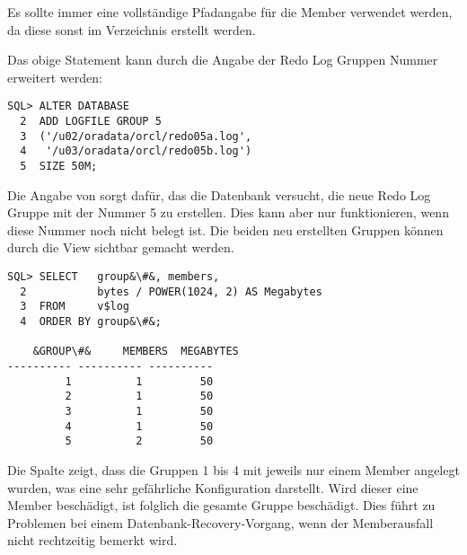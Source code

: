           \begin{merke}
            Es sollte immer eine vollständige Pfadangabe für die Member verwendet werden, da diese sonst im Verzeichnis  erstellt werden.
          \end{merke}
          Das obige Statement kann durch die Angabe der Redo Log Gruppen Nummer erweitert werden:
          \begin{lstlisting}[caption={Erzeugen einer Redo Log Gruppe mit Angabe der Gruppennummer},label=admin31,language=oracle_sql]
SQL> ALTER DATABASE
  2  ADD LOGFILE GROUP 5
  3  ('/u02/oradata/orcl/redo05a.log',
  4   '/u03/oradata/orcl/redo05b.log')
  5  SIZE 50M;
          \end{lstlisting}
          Die Angabe von  sorgt dafür, das die Datenbank versucht, die neue Redo Log Gruppe mit der Nummer 5 zu erstellen. Dies kann aber nur funktionieren, wenn diese Nummer noch nicht belegt ist. Die beiden neu erstellten Gruppen können durch die View  sichtbar gemacht werden.
          \begin{lstlisting}[caption={Die View \identifier{v\$log}},label=admin32,language=oracle_sql]
SQL> SELECT   group&\#&, members,
  2           bytes / POWER(1024, 2) AS Megabytes
  3  FROM     v$log
  4  ORDER BY group&\#&;

    &GROUP\#&     MEMBERS  MEGABYTES
---------- ---------- ----------
         1          1         50
         2          1         50
         3          1         50
         4          1         50
         5          2         50
          \end{lstlisting}
          Die Spalte  zeigt, dass die Gruppen 1 bis 4 mit jeweils nur einem Member angelegt wurden, was eine sehr gefährliche Konfiguration darstellt. Wird dieser eine Member beschädigt, ist folglich die gesamte Gruppe beschädigt. Dies führt zu Problemen bei einem Datenbank-Recovery-Vorgang, wenn der Memberausfall nicht rechtzeitig bemerkt wird.
